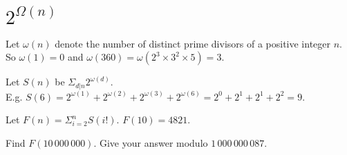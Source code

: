 \section[Problem \#675: $2^{Ω(n)}$]{$2^{Ω(n)}$}
\label{sec:problem_675}

Let $\omega(n)$ denote the number of distinct prime divisors of
a positive integer $n$.\\
So $\omega(1) = 0$ and $\omega(360) = \omega(2^{3} \times 3^{2} \times 5) = 3$.

Let $S(n)$ be $ \Sigma_{d | n} 2^{\omega(d)}  $.\\
E.g. $S(6) = 2^{\omega(1)}+2^{\omega(2)}+2^{\omega(3)}+2^{\omega(6)} = 2^0+2^1+2^1+2^2 = 9$.

Let $F(n)=\Sigma_{i=2}^n S(i!)$. $F(10)=4821.$

Find $F(10\,000\,000)$. Give your answer modulo
$1\,000\,000\,087$.